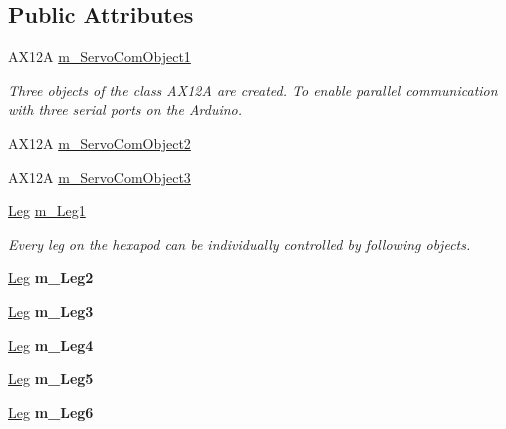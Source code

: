 \subsection*{Public Attributes}
\textbf{ }\par
\begin{DoxyCompactItemize}
\item 
A\+X12A \mbox{\hyperlink{class_movement_controller_ac4642ac20e0affff60ff0b8c0e5efdbb}{m\+\_\+\+Servo\+Com\+Object1}}
\begin{DoxyCompactList}\small\item\em Three objects of the class A\+X12A are created. To enable parallel communication with three serial ports on the Arduino. \end{DoxyCompactList}\item 
A\+X12A \mbox{\hyperlink{class_movement_controller_abd74aff807ff311c6891311414ae3993}{m\+\_\+\+Servo\+Com\+Object2}}
\item 
A\+X12A \mbox{\hyperlink{class_movement_controller_afbe7c5a0e099b5e879d64b6ab72f7127}{m\+\_\+\+Servo\+Com\+Object3}}
\end{DoxyCompactItemize}

\textbf{ }\par
\begin{DoxyCompactItemize}
\item 
\mbox{\label{class_movement_controller_a13bd6406481979df9aa10857a38d3381}} 
\mbox{\hyperlink{class_leg}{Leg}} \mbox{\hyperlink{class_movement_controller_a13bd6406481979df9aa10857a38d3381}{m\+\_\+\+Leg1}}
\begin{DoxyCompactList}\small\item\em Every leg on the hexapod can be individually controlled by following objects. \end{DoxyCompactList}\item 
\mbox{\label{class_movement_controller_a98baf7599b6b5c5a4dc852301dc19268}} 
\mbox{\hyperlink{class_leg}{Leg}} {\bfseries m\+\_\+\+Leg2}
\item 
\mbox{\label{class_movement_controller_a0d4edfeb6b4c2ad57dd3b1e387bc4de9}} 
\mbox{\hyperlink{class_leg}{Leg}} {\bfseries m\+\_\+\+Leg3}
\item 
\mbox{\label{class_movement_controller_a8f776e74969ff7983f6cc6909e1dec27}} 
\mbox{\hyperlink{class_leg}{Leg}} {\bfseries m\+\_\+\+Leg4}
\item 
\mbox{\label{class_movement_controller_aa72587ce1fb41820aa9a8f3b94496e69}} 
\mbox{\hyperlink{class_leg}{Leg}} {\bfseries m\+\_\+\+Leg5}
\item 
\mbox{\label{class_movement_controller_a7844bc42dba768e27bb5eb86bea99ef6}} 
\mbox{\hyperlink{class_leg}{Leg}} {\bfseries m\+\_\+\+Leg6}
\end{DoxyCompactItemize}



